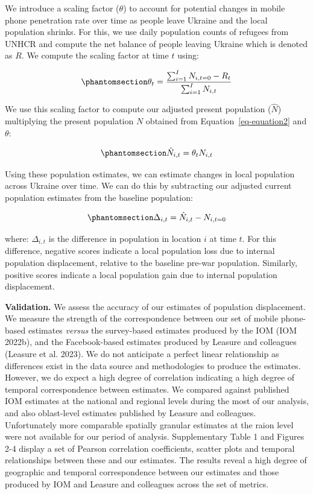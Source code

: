 \documentclass[
  sn-nature,
  11pt,
]{sn-jnl}
\begin{document}
We introduce a scaling factor (\(\theta\)) to account for potential
changes in mobile phone penetration rate over time as people leave
Ukraine and the local population shrinks. For this, we use daily
population counts of refugees from UNHCR and compute the net balance of
people leaving Ukraine which is denoted as \(R\). We compute the scaling
factor at time \(t\) using:

\begin{equation}\phantomsection\label{eq-equation3}{ \theta_{t} = \frac{\sum_{i=1}^I N_{i,t=0} - R_{t}}{\sum_{i=1}^I N_{i,t}} }\end{equation}

We use this scaling factor to compute our adjusted present population
(\(\hat{N}\)) multiplying the present population \(N\) obtained from
Equation~\ref{eq-equation2} and \(\theta\):

\begin{equation}\phantomsection\label{eq-equation4}{ \hat{N}_{i,t} = \theta_{t} N_{i,t} }\end{equation}

Using these population estimates, we can estimate changes in local
population across Ukraine over time. We can do this by subtracting our
adjusted current population estimates from the baseline population:

\begin{equation}\phantomsection\label{eq-equation5}{ \Delta_{i,t} = \hat{N}_{i,t} - N_{i,t=0}}\end{equation}

where: \(\Delta_{i,t}\) is the difference in population in location
\(i\) at time \(t\). For this difference, negative scores indicate a
local population loss due to internal population displacement, relative
to the baseline pre-war population. Similarly, positive scores indicate
a local population gain due to internal population displacement.

\textbf{Validation.} We assess the accuracy of our estimates of
population displacement. We measure the strength of the correspondence
between our set of mobile phone-based estimates \emph{versus} the
survey-based estimates produced by the IOM (IOM 2022b), and the
Facebook-based estimates produced by Leasure and colleagues (Leasure et
al. 2023). We do not anticipate a perfect linear relationship as
differences exist in the data source and methodologies to produce the
estimates. However, we do expect a high degree of correlation indicating
a high degree of temporal correspondence between estimates. We compared
against published IOM estimates at the national and regional levels
during the most of our analysis, and also oblast-level estimates
published by Leasure and colleagues. Unfortunately more comparable
spatially granular estimates at the raion level were not available for
our period of analysis. Supplementary Table 1 and Figures 2-4 display a
set of Pearson correlation coefficients, scatter plots and temporal
relationships between these and our estimates. The results reveal a high
degree of geographic and temporal correspondence between our estimates
and those produced by IOM and Leasure and colleagues across the set of
metrics.
\end{document}
